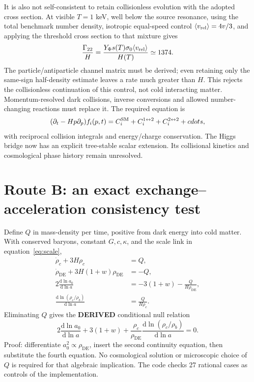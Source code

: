 \documentclass[11pt]{article}
\newcommand{\dd}{\mathrm d}
\newcommand{\DE}{\mathrm{DE}}
\begin{document}
It is also not self-consistent to retain collisionless evolution with the
adopted cross section. At visible $T=1$ keV, well below the source resonance,
using the total benchmark number density, isotropic equal-speed control
$\langle v_{\rm rel}\rangle=4v/3$, and applying the threshold cross section
to that mixture gives
\begin{equation}
 \frac{\Gamma_{22}}H=\frac{Y_\Phi s(T)\sigma_0\langle v_{\rm rel}\rangle}{H(T)}
 \simeq1374.
\end{equation}
The particle/antiparticle channel matrix must be derived; even retaining only
the same-sign half-density estimate leaves a rate much greater than $H$.
This rejects the collisionless continuation of this control, not cold
interacting matter. Momentum-resolved dark collisions, inverse conversions
and allowed number-changing reactions must replace it. The required equation is
\begin{equation}
 (\partial_t-Hp\partial_p)f_i(p,t)
 =C_i^{\rm SM}+C_i^{1\leftrightarrow2}+C_i^{2\leftrightarrow2}+cdots,
\end{equation}
with reciprocal collision integrals and energy/charge conservation.
The Higgs bridge now has an explicit tree-stable scalar extension. Its
collisional kinetics and cosmological phase history remain unresolved.

\section{Route B: an exact exchange--acceleration consistency test}
Define $Q$ in mass-density per time, positive from dark energy into cold
matter. With conserved baryons, constant $G,c,\kappa$, and the scale link
in equation~\eqref{eq:scale},
\begin{align}
 \dot\rho_c+3H\rho_c&=Q,\\
 \dot\rho_\DE+3H(1+w)\rho_\DE&=-Q,\\
 2\frac{\dd\ln a_0}{\dd\ln a}
 &=-3(1+w)-\frac{Q}{H\rho_\DE},\\
 \frac{\dd\ln(\rho_c/\rho_b)}{\dd\ln a}&=\frac{Q}{H\rho_c}.
\end{align}
Eliminating $Q$ gives the \textbf{DERIVED} conditional null relation
\begin{equation}
 \boxed{2\frac{\dd\ln a_0}{\dd\ln a}+3(1+w)
 +\frac{\rho_c}{\rho_\DE}
 \frac{\dd\ln(\rho_c/\rho_b)}{\dd\ln a}=0.}
\label{eq:null}
\end{equation}
Proof: differentiate $a_0^2\propto\rho_\DE$, insert the second continuity
equation, then substitute the fourth equation. No cosmological solution
or microscopic choice of $Q$ is required for that algebraic implication.
The code checks 27 rational cases as controls of the implementation.
\end{document}
